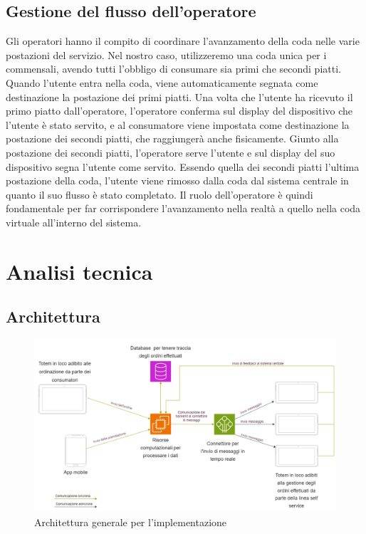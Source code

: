 \documentclass[a4paper, titlepage, 12pt, openright, twoside]{book}
\begin{document}
\subsection{Gestione del flusso dell'operatore}
Gli operatori hanno il compito di coordinare l'avanzamento della coda nelle varie postazioni del servizio.
Nel nostro caso, utilizzeremo una coda unica per i commensali, avendo tutti l'obbligo di consumare sia primi che secondi piatti.
Quando l'utente entra nella coda, viene automaticamente segnata come destinazione la postazione dei primi piatti.
Una volta che l'utente ha ricevuto il primo piatto dall'operatore, l'operatore conferma sul display del dispositivo che l'utente è stato servito,
e al consumatore viene impostata come destinazione la postazione dei secondi piatti, che raggiungerà anche fisicamente.
Giunto alla postazione dei secondi piatti, l'operatore serve l'utente e sul display del suo dispositivo segna l'utente come servito. Essendo quella dei secondi piatti l'ultima
postazione della coda, l'utente viene rimosso dalla coda dal sistema centrale in quanto il suo flusso è stato completato. Il ruolo dell'operatore è quindi fondamentale per far corrispondere l'avanzamento nella realtà a quello nella coda virtuale all'interno del sistema.

\section{Analisi tecnica}

\subsection{Architettura}

\begin{figure}[h]
\caption{Architettura generale per l'implementazione}
\includegraphics[scale=0.40]{architettura}
\centering
\end{figure}
\end{document}
